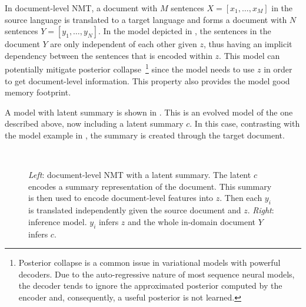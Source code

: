 In document-level NMT, a document with $M$ sentences $X=[x_1, \dots,
    x_M]$ in the source language is translated to a target language and
forms a document with $N$ sentences $Y=[y_1, \dots, y_N]$. In the
model depicted in , the sentences in the
document $Y$ are only independent of each other given $z$, thus
having an implicit dependency between the sentences that is encoded
within $z$. This model can potentially mitigate posterior
collapse~\footnote{Posterior collapse is a common issue in
    variational models with powerful decoders. Due to the auto-regressive
    nature of most sequence neural models, the decoder tends to ignore
    the approximated posterior computed by the encoder and, consequently,
    a useful posterior is not learned.} since the model needs to use $z$
in order to get document-level information. This property also
provides the model good memory footprint.

A model with latent summary is shown in
. This is an evolved model of the
one described above, now including a latent summary $c$. In this
case, contrasting with the model example in
, the summary is created through the
target document.

\begin{figure}[t]
    \centering
    ~

    \caption{{\it Left}: document-level NMT with a latent summary.
        The latent $c$ encodes a summary representation of the document.
        This summary is then used to encode
        document-level features into $z$. Then each $y_i$ is translated
        independently given the source document and $z$. {\it Right}:
        inference model. $y_i$ infers $z$ and the whole in-domain
        document $Y$ infers $c$.}
    \label{fig:doclevelstatistician}

\end{figure}

\cleardoublepage

\singlespacing
